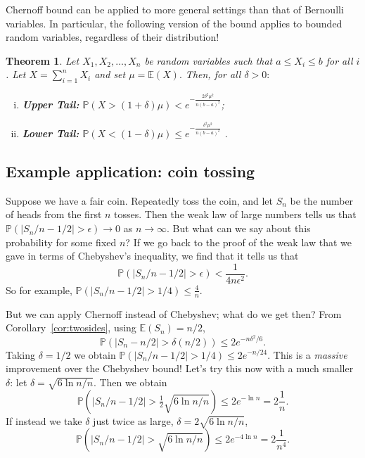 \documentclass[10pt]{article}
\newtheorem{theorem}{Theorem}
\newcommand{\E}{\mathbb{E}}
\renewcommand{\Pr}{\mathbb{P}}
\begin{document}
Chernoff bound can be applied to more general settings than that of Bernoulli variables. In particular, the following version of the bound applies to bounded random variables, regardless of their distribution! 
\begin{theorem}
Let $X_1, X_2, \ldots, X_n$ be random variables such that $a \leq X_i \leq b$ for all $i$. Let $X=\sum_{i=1}^n X_i$ and set $\mu = \E(X).$
Then, for all $\delta > 0:$
\begin{enumerate}[(i)]
        \item {\bf Upper Tail:} $\displaystyle\Pr(X > (1 + \delta)\mu) <
          e^{-\frac{2 \delta^2 \mu^2}{n (b-a)^2}}$;
            \item {\bf Lower Tail:} $\displaystyle\Pr(X  < (1 - \delta)\mu) \leq e^{-\frac{\delta^2 \mu^2}{n (b-a)^2}}$ .
        \end{enumerate}
\end{theorem}

\subsection*{Example application: coin tossing}
Suppose we have a fair coin. 
Repeatedly toss the coin, and let $S_n$ be the number of heads from the first $n$ tosses.
Then the weak law of large numbers tells us that $\Pr(|S_n/n - 1/2| > \epsilon) \to 0$ as $n \to \infty$.
But what can we say about this probability for some fixed $n$? 
If we go back to the proof of the weak law that we gave in terms of Chebyshev's inequality, we find that it tells us that
\[ \Pr(|S_n / n - 1/2| > \epsilon) < \frac{1}{4n\epsilon^2}. \]
So for example, $\Pr(|S_n/n - 1/2| > 1/4) \leq \frac{4}{n}$.

But we can apply Chernoff instead of Chebyshev; what do we get then?
From Corollary~\ref{cor:twosides}, using $\E(S_n) = n/2$, 
\[ \Pr(|S_n - n/2| > \delta(n/2)) \leq 2e^{-n\delta^2/6}. \]
Taking $\delta=1/2$ we obtain $\Pr(|S_n/n-1/2| > 1/4) \leq 2e^{-n/24}$.
This is a \emph{massive} improvement over the Chebyshev bound! 
Let's try this now with a much smaller $\delta$: let $\delta = \sqrt{6\ln n/n}$. Then we obtain
\[ \Pr(|S_n/n-1/2| > \tfrac12\sqrt{6 \ln n/n}) \leq 2e^{-\ln n} = 2\frac{1}{n}. \]
If instead we take $\delta$ just twice as large, $\delta = 2\sqrt{6\ln n/n}$, 
\[  \Pr(|S_n/n-1/2| > \sqrt{6 \ln n/n}) \leq 2e^{-4\ln n} = 2\frac{1}{n^4}. \]
\end{document}
